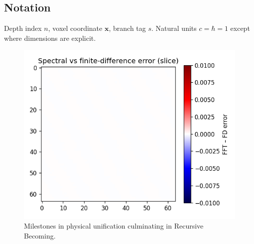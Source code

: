 \subsection{Notation}

Depth index $n$, voxel coordinate $\mathbf x$, branch tag $s$.
Natural units $c=\hbar=1$ except where dimensions are explicit.

\begin{figure}[t]
  \centering

\includegraphics[width=0.8\linewidth]{figs/intro_timeline.png}



  \caption{Milestones in physical unification culminating in Recursive Becoming.}
  \label{fig:intro-timeline}
\end{figure}

\clearpage
